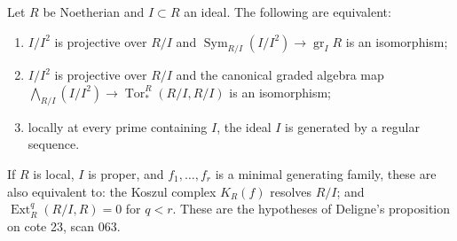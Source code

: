 \begin{theorem}\label{SA23-C-7}
Let $R$ be Noetherian and $I\subset R$ an ideal.  The following are
equivalent:
\begin{enumerate}
\item $I/I^2$ is projective over $R/I$ and
$\operatorname{Sym}_{R/I}(I/I^2)\to\operatorname{gr}_I R$ is an
isomorphism;
\item $I/I^2$ is projective over $R/I$ and the canonical graded
algebra map
$\bigwedge_{R/I}(I/I^2)\to\operatorname{Tor}^R_*(R/I,R/I)$ is an
isomorphism;
\item locally at every prime containing $I$, the ideal $I$ is generated
by a regular sequence.
\end{enumerate}
If $R$ is local, $I$ is proper, and $f_1,\ldots,f_r$ is a minimal
generating family, these are also equivalent to: the Koszul complex
$K_R(f)$ resolves $R/I$; and
$\operatorname{Ext}^q_R(R/I,R)=0$ for $q<r$.
These are the hypotheses of Deligne's proposition on cote 23, scan 063.
\end{theorem}
